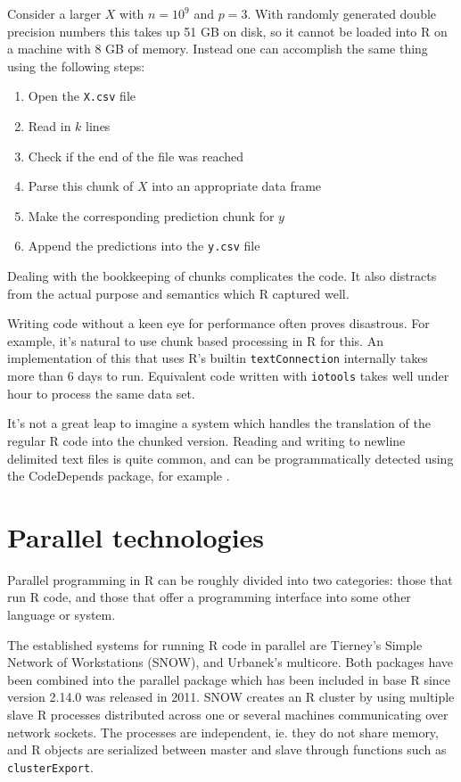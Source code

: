 \documentclass[12pt]{article}
\begin{document}
Consider a larger $X$ with $n = 10^{9}$ and $p = 3$. With randomly generated double
precision numbers this takes up 51 GB on disk, so it cannot be loaded into
R on a machine with 8 GB of memory. Instead one can accomplish the same
thing using the following steps:
\begin{enumerate}
    \item Open the \texttt{X.csv} file
    \item Read in $k$ lines
    \item Check if the end of the file was reached
    \item Parse this chunk of $X$ into an appropriate data frame
    \item Make the corresponding prediction chunk for $y$
    \item Append the predictions into the \texttt{y.csv} file
\end{enumerate}

Dealing with the bookkeeping of chunks complicates the code.  It also
distracts from the actual purpose and semantics which R captured well.

Writing code without a keen eye for performance often proves disastrous.
For example, it's natural to use chunk based processing in R for this. An
implementation of this that uses R's builtin \texttt{textConnection}
internally takes more than 6 days to run. Equivalent code written with
\texttt{iotools} takes well under hour to process the same data set.

It's not a great leap to imagine a system which handles the translation
of the regular R code into the chunked version. Reading and writing
to newline delimited text files is quite common, and can be
programmatically detected using the CodeDepends package, for example
\cite{R-CodeDepends}.

\section{Parallel technologies}

Parallel programming in R can be roughly divided into two categories: those
that run R code, and those that offer a programming interface into some
other language or system. 

The established systems for running R code in parallel are Tierney's Simple
Network of Workstations (SNOW), and Urbanek's multicore. Both packages have
been combined into the parallel package which has been included in base R since
version 2.14.0 was released in 2011. SNOW creates
an R cluster by using multiple slave R processes distributed across one or
several machines communicating over network sockets. The processes are independent,
ie. they do not share memory, and R objects are serialized
between master and slave through functions such as \texttt{clusterExport}.
\end{document}

